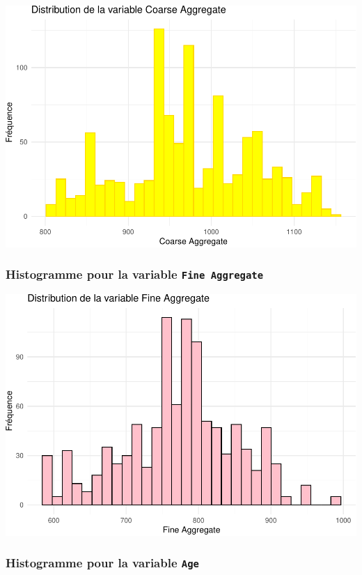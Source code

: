 \documentclass[
  12pt,
]{article}
\begin{document}
\includegraphics{rmd_final_files/figure-latex/unnamed-chunk-45-1.pdf}

\subsubsection{\texorpdfstring{Histogramme pour la variable
\texttt{Fine\ Aggregate}}{Histogramme pour la variable Fine Aggregate}}\label{histogramme-pour-la-variable-fine-aggregate}

\includegraphics{rmd_final_files/figure-latex/unnamed-chunk-46-1.pdf}

\subsubsection{\texorpdfstring{Histogramme pour la variable
\texttt{Age}}{Histogramme pour la variable Age}}\label{histogramme-pour-la-variable-age}
\end{document}
